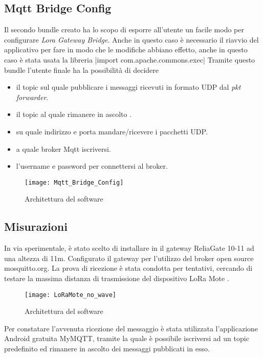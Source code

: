 \subsection{Mqtt Bridge Config}
Il secondo bundle creato ha lo scopo di esporre all'utente un facile modo per
configurare  \emph{Lora Gateway Bridge}.  Anche in questo caso è necessario il
riavvio del applicativo per fare in modo che le modifiche abbiano effetto, anche
in questo caso è stata usata la libreria
|import com.apache.commons.exec|
Tramite questo bundle l'utente finale ha la possibilità di decidere 
\begin{itemize}
\item il topic sul quale pubblicare i messaggi ricevuti in formato UDP dal
\emph{pkt forwarder}.
\item il topic al quale rimanere in ascolto .
\item su quale indirizzo e porta mandare/ricevere i pacchetti UDP.
\item a quale broker Mqtt iscriversi.
\item l'username e password per connettersi al broker.
\end{itemize}

\begin{figure}[h]
\centering 
\texttt{[image: Mqtt\_Bridge\_Config]}
\caption{Architettura del software}
\label{fig:Software_stack}
\end{figure}

\subsection{Misurazioni}
In via sperimentale, è stato scelto di installare in  il gateway
ReliaGate 10-11 ad una altezza di 11m. Configurato il gateway per l'utilizzo del
broker open source  mosquitto.org. La prova di ricezione è stata condotta per
tentativi, cercando di testare la massima distanza di trasmissione del
dispositivo LoRa Mote . 

\begin{figure}[h]
\centering 
\texttt{[image: LoRaMote\_no\_wave]}
\caption{Architettura del software}
\label{fig:Software_stack}
\end{figure}

Per constatare l'avvenuta ricezione del
messaggio è stata utilizzata l'applicazione Android gratuita MyMQTT, tramite la
quale è  possibile iscriversi ad un topic predefinito ed rimanere in ascolto dei
messaggi pubblicati in esso. 

